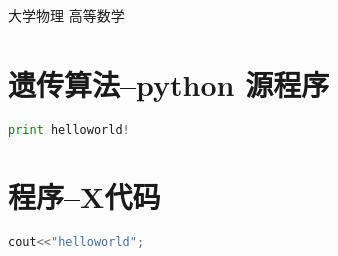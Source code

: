 \documentclass[withoutpreface,bwprint]{cumcmthesis} %
\begin{document}
\begin{thebibliography}{9}%
  大学物理
  高等数学
\end{thebibliography}

\newpage
\begin{appendices}
\section{遗传算法--python 源程序}
\begin{lstlisting}[language=python]
print helloworld!
 \end{lstlisting}
 \section{程序--X代码}
\begin{lstlisting}[language=c]
cout<<"helloworld";
 \end{lstlisting}
\end{appendices}
\end{document}

